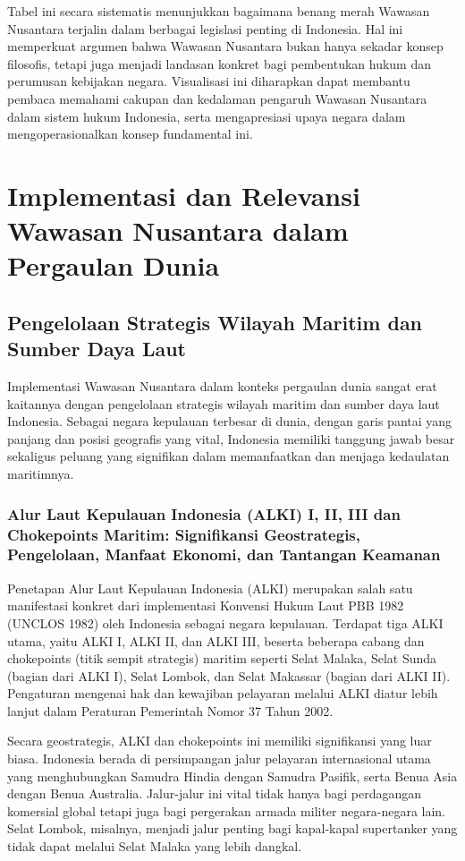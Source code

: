 \documentclass[12pt, a4paper]{article}
\begin{document}
Tabel ini secara sistematis menunjukkan bagaimana benang merah Wawasan Nusantara terjalin dalam berbagai legislasi penting di Indonesia. Hal ini memperkuat argumen bahwa Wawasan Nusantara bukan hanya sekadar konsep filosofis, tetapi juga menjadi landasan konkret bagi pembentukan hukum dan perumusan kebijakan negara. Visualisasi ini diharapkan dapat membantu pembaca memahami cakupan dan kedalaman pengaruh Wawasan Nusantara dalam sistem hukum Indonesia, serta mengapresiasi upaya negara dalam mengoperasionalkan konsep fundamental ini.
\section{Implementasi dan Relevansi Wawasan Nusantara dalam Pergaulan Dunia}
\subsection*{Pengelolaan Strategis Wilayah Maritim dan Sumber Daya Laut}

Implementasi Wawasan Nusantara dalam konteks pergaulan dunia sangat erat kaitannya dengan pengelolaan strategis wilayah maritim dan sumber daya laut Indonesia. Sebagai negara kepulauan terbesar di dunia, dengan garis pantai yang panjang dan posisi geografis yang vital, Indonesia memiliki tanggung jawab besar sekaligus peluang yang signifikan dalam memanfaatkan dan menjaga kedaulatan maritimnya.
\subsubsection*{Alur Laut Kepulauan Indonesia (ALKI) I, II, III dan Chokepoints Maritim: Signifikansi Geostrategis, Pengelolaan, Manfaat Ekonomi, dan Tantangan Keamanan}

Penetapan Alur Laut Kepulauan Indonesia (ALKI) merupakan salah satu manifestasi konkret dari implementasi Konvensi Hukum Laut PBB 1982 (UNCLOS 1982) oleh Indonesia sebagai negara kepulauan. Terdapat tiga ALKI utama, yaitu ALKI I, ALKI II, dan ALKI III, beserta beberapa cabang dan chokepoints (titik sempit strategis) maritim seperti Selat Malaka, Selat Sunda (bagian dari ALKI I), Selat Lombok, dan Selat Makassar (bagian dari ALKI II). Pengaturan mengenai hak dan kewajiban pelayaran melalui ALKI diatur lebih lanjut dalam Peraturan Pemerintah Nomor 37 Tahun 2002.  

Secara geostrategis, ALKI dan chokepoints ini memiliki signifikansi yang luar biasa. Indonesia berada di persimpangan jalur pelayaran internasional utama yang menghubungkan Samudra Hindia dengan Samudra Pasifik, serta Benua Asia dengan Benua Australia. Jalur-jalur ini vital tidak hanya bagi perdagangan komersial global tetapi juga bagi pergerakan armada militer negara-negara lain. Selat Lombok, misalnya, menjadi jalur penting bagi kapal-kapal supertanker yang tidak dapat melalui Selat Malaka yang lebih dangkal.  
\end{document}
